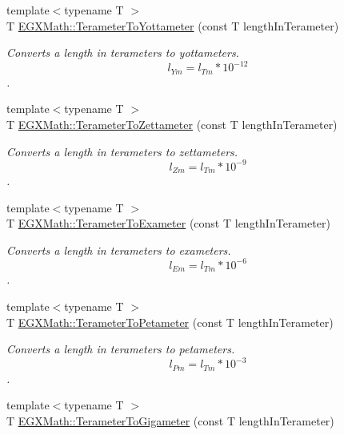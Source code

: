 \begin{DoxyCompactItemize}
{\footnotesize template$<$typename T $>$ }\\T \mbox{\hyperlink{group___e_g_x_math-_conversions-_length_conversions-_s_i-_terameter-_s_i_gab0411fd993ebfe0b23de8d672203f68e}{E\+G\+X\+Math\+::\+Terameter\+To\+Yottameter}} (const T length\+In\+Terameter)
\begin{DoxyCompactList}\small\item\em Converts a length in terameters to yottameters. \[ l_{Ym}=l_{Tm} * 10^{-12} \]. \end{DoxyCompactList}\item 
{\footnotesize template$<$typename T $>$ }\\T \mbox{\hyperlink{group___e_g_x_math-_conversions-_length_conversions-_s_i-_terameter-_s_i_gad897b4a8fd5405a7996ae3437194b030}{E\+G\+X\+Math\+::\+Terameter\+To\+Zettameter}} (const T length\+In\+Terameter)
\begin{DoxyCompactList}\small\item\em Converts a length in terameters to zettameters. \[ l_{Zm}=l_{Tm} * 10^{-9} \]. \end{DoxyCompactList}\item 
{\footnotesize template$<$typename T $>$ }\\T \mbox{\hyperlink{group___e_g_x_math-_conversions-_length_conversions-_s_i-_terameter-_s_i_ga9b268bd91e8ba4853c2732b80bca0539}{E\+G\+X\+Math\+::\+Terameter\+To\+Exameter}} (const T length\+In\+Terameter)
\begin{DoxyCompactList}\small\item\em Converts a length in terameters to exameters. \[ l_{Em}=l_{Tm} * 10^{-6} \]. \end{DoxyCompactList}\item 
{\footnotesize template$<$typename T $>$ }\\T \mbox{\hyperlink{group___e_g_x_math-_conversions-_length_conversions-_s_i-_terameter-_s_i_ga0e5474db8b07f9fd87fa6539a02af527}{E\+G\+X\+Math\+::\+Terameter\+To\+Petameter}} (const T length\+In\+Terameter)
\begin{DoxyCompactList}\small\item\em Converts a length in terameters to petameters. \[ l_{Pm}=l_{Tm} * 10^{-3} \]. \end{DoxyCompactList}\item 
{\footnotesize template$<$typename T $>$ }\\T \mbox{\hyperlink{group___e_g_x_math-_conversions-_length_conversions-_s_i-_terameter-_s_i_gaf7d05e4ba6ba85ee7c75c65647178cb8}{E\+G\+X\+Math\+::\+Terameter\+To\+Gigameter}} (const T length\+In\+Terameter)

\end{DoxyCompactItemize}
